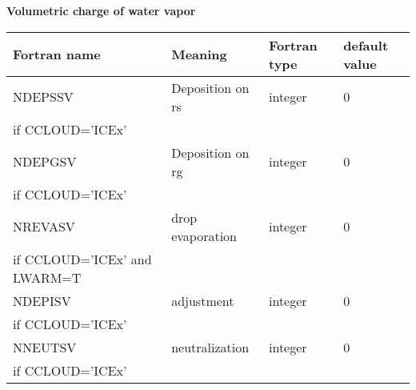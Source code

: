 \textbf{Volumetric charge of water vapor}
\begin{longtable} {|p{}|p{}|>{\centering}p{}|p{}<{\centering}|}
\hline
Fortran name & Meaning & Fortran type & default value \\
\hline \hline
\endhead
NDEPSSV & Deposition on rs& integer & 0 \\ \nopagebreak
if CCLOUD='ICEx' &&& \\\hline

NDEPGSV & Deposition on rg& integer & 0 \\ \nopagebreak
if CCLOUD='ICEx' &&& \\\hline

NREVASV & drop evaporation & integer & 0 \\ \nopagebreak
if CCLOUD='ICEx' and LWARM=T &&& \\\hline

NDEPISV & adjustment& integer & 0 \\ \nopagebreak
if CCLOUD='ICEx' &&& \\\hline

NNEUTSV & neutralization & integer & 0 \\ \nopagebreak
if CCLOUD='ICEx' &&& \\\hline
\end{longtable}

